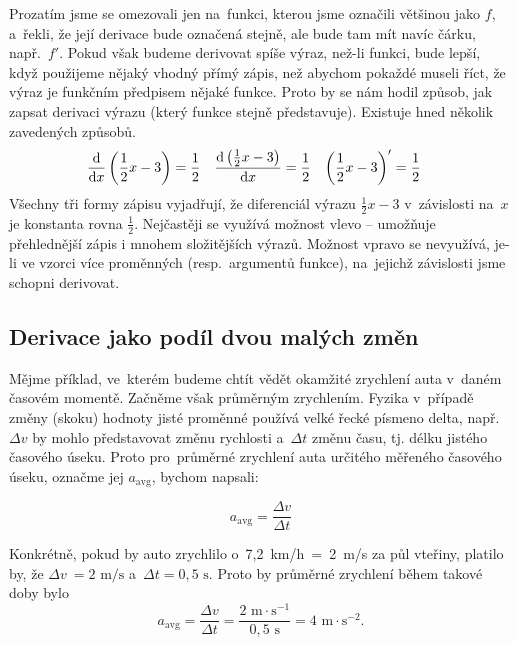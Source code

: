 Prozatím jsme se omezovali jen na~funkci, kterou jsme označili většinou jako $f$,
a~řekli, že její derivace bude označená stejně, ale bude tam mít navíc čárku,
např.~$f'$. Pokud však budeme derivovat spíše výraz, než-li funkci, bude lepší, když
použijeme nějaký vhodný přímý zápis, než abychom pokaždé museli říct, že výraz je
funkčním předpisem nějaké funkce. Proto by se nám hodil způsob, jak zapsat derivaci
výrazu (který funkce stejně představuje). Existuje hned několik zavedených způsobů.
\begin{align*}
    \frac{\mathrm{d}}{\mathrm{d} x} \left( \frac12 x - 3 \right) &= \frac12 &
    \frac{\mathrm{d} \left( \frac12 x - 3 \right)}{\mathrm{d} x}  &= \frac12 &
    \left( \frac12 x - 3 \right)'               &= \frac12
\end{align*}
Všechny tři formy zápisu vyjadřují, že diferenciál výrazu ${\frac12 x - 3}$
v~závislosti na~$x$ je konstanta rovna $\frac12$. Nejčastěji se využívá možnost vlevo
-- umožňuje přehlednější zápis i mnohem složitějších výrazů. Možnost vpravo se
nevyužívá, je-li ve vzorci více proměnných (resp.\ argumentů funkce), na~jejichž
závislosti jsme schopni derivovat.

\subsection{Derivace jako podíl dvou malých změn}
\label{subsec:derivace-jako-podil}

Mějme příklad, ve~kterém budeme chtít vědět okamžité zrychlení auta v~daném časovém
momentě. Začněme však průměrným zrychlením. Fyzika v~případě změny (skoku) hodnoty
jisté proměnné používá velké řecké písmeno delta, např. $\Delta v$ by mohlo
představovat změnu rychlosti a~$\Delta t$ změnu času, tj. délku jistého časového
úseku. Proto pro~průměrné zrychlení auta určitého měřeného časového úseku, označme
jej $a_{\text{avg}}$,  bychom napsali:

\begin{equation*}
    a_{\text{avg}} = \frac{\Delta v}{\Delta t}
\end{equation*}

Konkrétně, pokud by auto zrychlilo o~7,2~km/h~=~2~m/s za půl vteřiny, platilo by, že
${\Delta v~= 2 \text{ m}/\text{s}}$ a~${\Delta t = 0,5 \text{ s}}$. Proto by průměrné
zrychlení během takové doby bylo
\begin{equation*}
    a_{\text{avg}}
    = \frac{\Delta v}{\Delta t}
    = \frac{2 \text{ m} \cdot \text{s}^{-1}}{0,5 \text{ s}}
    = 4 \text{ m} \cdot \text{s}^{-2}\text{.}
\end{equation*}

